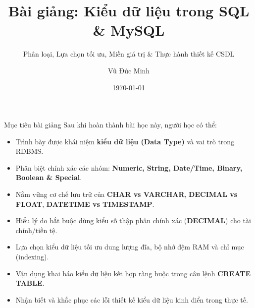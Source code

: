 \documentclass[aspectratio=169,11pt]{beamer}
\title[Kiểu dữ liệu SQL]{Bài giảng: Kiểu dữ liệu trong SQL \& MySQL}
\subtitle{Phân loại, Lựa chọn tối ưu, Miền giá trị \& Thực hành thiết kế CSDL}
\author[Vũ Đức Minh]{Vũ Đức Minh}
\institute[NEU]{Trường Đại học Kinh tế Quốc dân (NEU), Hà Nội, Việt Nam}
\date{\today}
\newcommand{\kw}[1]{\textcolor{dbblue}{\textbf{#1}}}
\begin{document}
\begin{frame}
  \titlepage
\end{frame}

\begin{frame}{Mục tiêu bài giảng}
Sau khi hoàn thành bài học này, người học có thể:
\begin{itemize}\setlength{\itemsep}{2pt}
  \item Trình bày được khái niệm \kw{kiểu dữ liệu (Data Type)} và vai trò trong RDBMS.
  \item Phân biệt chính xác các nhóm: \kw{Numeric, String, Date/Time, Binary, Boolean \& Special}.
  \item Nắm vững cơ chế lưu trữ của \kw{CHAR vs VARCHAR}, \kw{DECIMAL vs FLOAT}, \kw{DATETIME vs TIMESTAMP}.
  \item Hiểu lý do bắt buộc dùng kiểu số thập phân chính xác (\kw{DECIMAL}) cho tài chính/tiền tệ.
  \item Lựa chọn kiểu dữ liệu tối ưu dung lượng đĩa, bộ nhớ đệm RAM và chỉ mục (indexing).
  \item Vận dụng khai báo kiểu dữ liệu kết hợp ràng buộc trong câu lệnh \kw{CREATE TABLE}.
  \item Nhận biết và khắc phục các lỗi thiết kế kiểu dữ liệu kinh điển trong thực tế.
\end{itemize}
\end{frame}
\end{document}
